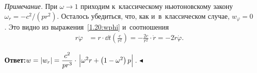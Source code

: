 \documentclass{weekly}
\begin{document}
\textsl{Примечание.} При $\omega \to 1$ приходим к~классическому
ньютоновскому закону $\omega_r = -c^2/(pr^2)$.
Осталось убедиться, что, как и~в~классическом случае, $w_\varphi = 0$.
Это видно из выражения~\eqref{1.20:wphi} и~соотношения
\begin{align}
    r \ddot\varphi &= r \cdot \dd{}{t} \left( \frac{c}{r^2} \right)
        = -\frac{2c}{r^2} \cdot \dot r = -2 \dot r \dot\varphi.
\end{align}

\textbf{Ответ:}\quad $w = \left| w_r \right| = \dfrac{c^2}{pr^3} \cdot
\left.\Big| \omega^2 r + \left( 1-\omega^2 \right) p \Big|\right.$.
\hfill $\blacktriangleleft$
\end{document}
